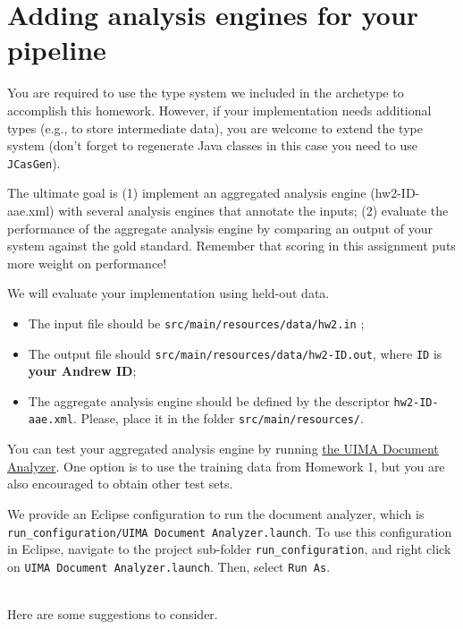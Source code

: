 
\section{Adding analysis engines for your pipeline}

You are required to use the type system we included in the archetype to
accomplish this homework. However, if your implementation needs additional 
types (e.g., to store intermediate data), 
you are welcome to extend the type system (don't forget to regenerate Java classes in this case
you need to use \texttt{JCasGen}).

The ultimate goal is (1) implement an aggregated analysis engine (hw2-ID-aae.xml) with several analysis engines
that annotate the inputs;
(2) evaluate the performance of the aggregate analysis engine by
comparing an output of your system against the gold standard.
Remember that scoring in this assignment puts more weight on performance!

We will evaluate your implementation using held-out data.
\begin{itemize}
\item The input file should be \texttt{src/main/resources/data/hw2.in} ;
\item The output file should  \texttt{src/main/resources/data/hw2-ID.out},
where \texttt{ID} is \textbf{your Andrew ID};
\item The aggregate analysis engine should be defined by 
the descriptor \texttt{hw2-ID-aae.xml}.
Please, place it in the folder   \texttt{src/main/resources/}.
\end{itemize}

You can test your aggregated analysis engine by running 
\href{http://uima.apache.org/d/uimaj-2.4.0/tools.html#ugr.tools.doc_analyzer}{the UIMA Document Analyzer}.
One option is to use the training data from Homework 1, but you are also encouraged
to obtain other test sets.

We provide an Eclipse configuration to run the document analyzer,
which is \newline\texttt{run\_configuration/UIMA Document Analyzer.launch}. 
To use this configuration in Eclipse, navigate to the project sub-folder \texttt{run\_configuration},
and right click on \texttt{UIMA Document Analyzer.launch}.
Then, select \texttt{Run As}.


~\\
Here are some suggestions to consider.

